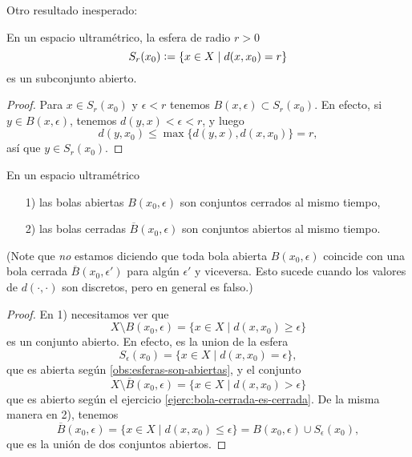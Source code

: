 \documentclass{article}
\numberwithin{equation}{section}
\theoremstyle{definition}
\begin{document}
Otro resultado inesperado:

\begin{observacion}
  \label{obs:esferas-son-abiertas}
  En un espacio ultramétrico, la esfera de radio $r > 0$
  $$S_r (x_0) \mathrel{\mathop:}= \{ x \in X \mid d (x,x_0) = r \}$$
  es un subconjunto abierto.

  \begin{proof}
    Para $x \in S_r (x_0)$ y $\epsilon < r$ tenemos
    $B (x,\epsilon) \subset S_r (x_0)$. En efecto, si $y \in B (x,\epsilon)$,
    tenemos $d (y,x) < \epsilon < r$, y luego
    $$d (y, x_0) \le \max \{ d (y,x), d (x,x_0) \} = r,$$
    así que $y \in S_r (x_0)$.
  \end{proof}
\end{observacion}

\begin{observacion}
  \label{obs:bolas-abiertas-son-cerradas-en-espacio-ultrametrico}
  En un espacio ultramétrico
  \begin{enumerate}
  \item[1)] las bolas abiertas $B (x_0,\epsilon)$ son conjuntos cerrados
    al mismo tiempo,
  \item[2)] las bolas cerradas $\overline{B} (x_0,\epsilon)$ son conjuntos
    abiertos al mismo tiempo.
  \end{enumerate}
\end{observacion}

\noindent (Note que \emph{no} estamos diciendo que toda bola abierta
$B (x_0,\epsilon)$ coincide con una bola cerrada $\overline{B} (x_0,\epsilon')$
para algún $\epsilon'$ y viceversa. Esto sucede cuando los valores de
$d (\cdot,\cdot)$ son discretos, pero en general es falso.)

\begin{proof}
  En 1) necesitamos ver que
  $$X \setminus B (x_0,\epsilon) = \{ x\in X \mid d (x,x_0) \ge \epsilon \}$$
  es un conjunto abierto. En efecto, es la union de la esfera
  $$S_\epsilon (x_0) = \{ x\in X \mid d (x,x_0) = \epsilon \},$$
  que es abierta según \ref{obs:esferas-son-abiertas}, y el conjunto
  $$X\setminus \overline{B} (x_0,\epsilon) = \{ x\in X \mid d (x,x_0) > \epsilon \}$$
  que es abierto según el ejercicio \ref{ejerc:bola-cerrada-es-cerrada}.
  De la misma manera en 2), tenemos
  \[ \overline{B} (x_0,\epsilon) =
     \{ x\in X \mid d (x,x_0) \le \epsilon \} =
     B (x_0,\epsilon)\cup S_\epsilon (x_0), \]
  que es la unión de dos conjuntos abiertos.
\end{proof}
\end{document}
